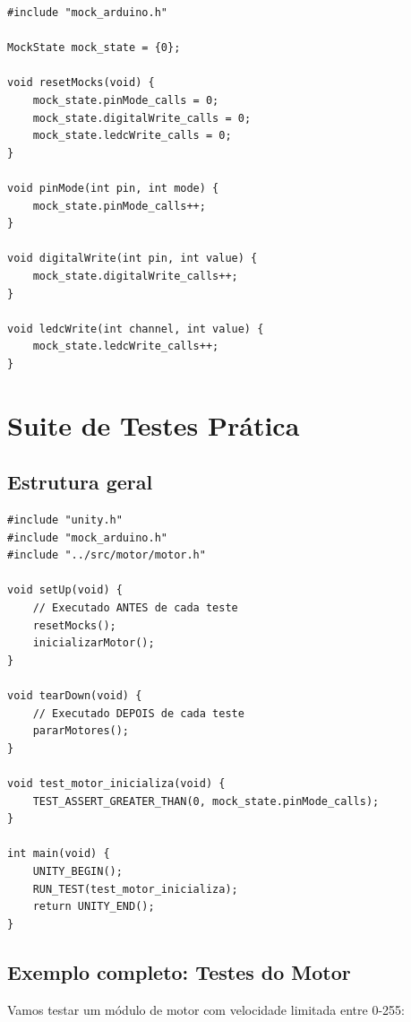 \documentclass[12pt,a4paper]{article}
\begin{document}
\begin{lstlisting}[caption=mock\_arduino.c - Implementação dos mocks]
#include "mock_arduino.h"

MockState mock_state = {0};

void resetMocks(void) {
    mock_state.pinMode_calls = 0;
    mock_state.digitalWrite_calls = 0;
    mock_state.ledcWrite_calls = 0;
}

void pinMode(int pin, int mode) {
    mock_state.pinMode_calls++;
}

void digitalWrite(int pin, int value) {
    mock_state.digitalWrite_calls++;
}

void ledcWrite(int channel, int value) {
    mock_state.ledcWrite_calls++;
}
\end{lstlisting}

\section{Suite de Testes Prática}

\subsection{Estrutura geral}

\begin{lstlisting}[caption=Estrutura básica de um arquivo de teste]
#include "unity.h"
#include "mock_arduino.h"
#include "../src/motor/motor.h"

void setUp(void) {
    // Executado ANTES de cada teste
    resetMocks();
    inicializarMotor();
}

void tearDown(void) {
    // Executado DEPOIS de cada teste
    pararMotores();
}

void test_motor_inicializa(void) {
    TEST_ASSERT_GREATER_THAN(0, mock_state.pinMode_calls);
}

int main(void) {
    UNITY_BEGIN();
    RUN_TEST(test_motor_inicializa);
    return UNITY_END();
}
\end{lstlisting}

\subsection{Exemplo completo: Testes do Motor}

Vamos testar um módulo de motor com velocidade limitada entre 0-255:
\end{document}

